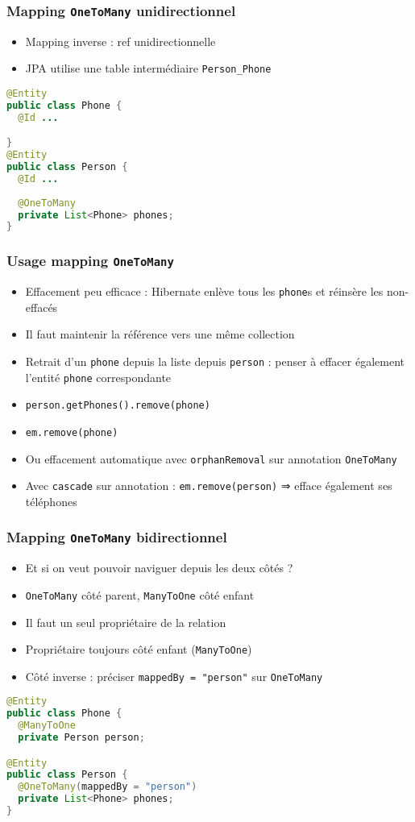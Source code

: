 \documentclass[french, english]{beamer}
\begin{document}
\begin{frame}[fragile]
	\frametitle{Mapping \texttt{OneToMany} unidirectionnel}
	\begin{itemize}
		\item Mapping inverse : ref  unidirectionnelle
		\item JPA utilise une table intermédiaire \texttt{Person\_Phone}%
	\end{itemize}
	\begin{lstlisting}[language=Java]
@Entity
public class Phone {
  @Id ...

}
@Entity
public class Person {
  @Id ...
  
  @OneToMany
  private List<Phone> phones;
}
	\end{lstlisting}
\end{frame}

\begin{frame}
	\frametitle{Usage mapping \texttt{OneToMany}}
	\begin{itemize}
		\item Effacement peu efficace : Hibernate enlève tous les \texttt{phone}s et réinsère les non-effacés
		\item Il faut maintenir la référence vers une même collection%
		\item Retrait d’un \texttt{phone} depuis la liste depuis \texttt{person} : penser à effacer également l’entité \texttt{phone} correspondante
		\item \texttt{person.getPhones().remove(phone)}
		\item \texttt{em.remove(phone)}
		\item Ou effacement automatique avec \texttt{orphanRemoval} sur annotation \texttt{OneToMany}
		\item Avec \texttt{cascade} sur annotation : \texttt{em.remove(person)} ⇒ efface également ses téléphones
	\end{itemize}
\end{frame}

\begin{frame}[fragile]
	\frametitle{Mapping \texttt{OneToMany} bidirectionnel}
	\begin{itemize}
		\item Et si on veut pouvoir naviguer depuis les deux côtés ?
		\item \texttt{OneToMany} côté parent, \texttt{ManyToOne} côté enfant
		\item Il faut un seul propriétaire de la relation
		\item Propriétaire toujours côté enfant (\texttt{ManyToOne})
		\item Côté inverse : préciser \texttt{mappedBy = "person"} sur \texttt{OneToMany}
	\end{itemize}
	\begin{lstlisting}[language=Java]
@Entity
public class Phone {
  @ManyToOne
  private Person person;

@Entity
public class Person {
  @OneToMany(mappedBy = "person")
  private List<Phone> phones;
}
\end{lstlisting}
\end{frame}
\end{document}

